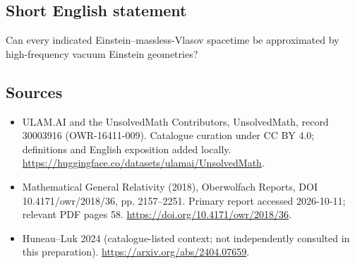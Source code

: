 \documentclass[11pt]{article}
\begin{document}
\subsection{Short English statement}
Can every indicated Einstein--massless-Vlasov spacetime be approximated by high-frequency vacuum Einstein geometries?
\subsection{Sources}
\begin{itemize}
\item[\hypertarget{source:30003916:1}{S1}] ULAM.AI and the UnsolvedMath Contributors, UnsolvedMath, record 30003916 (OWR-16411-009). Catalogue curation under CC BY 4.0; definitions and English exposition added locally.
\url{https://huggingface.co/datasets/ulamai/UnsolvedMath}.
\item[\hypertarget{source:30003916:2}{S2}] Mathematical General Relativity (2018), Oberwolfach Reports, DOI 10.4171/owr/2018/36, pp. 2157--2251. Primary report accessed 2026-10-11; relevant PDF pages 58.
\url{https://doi.org/10.4171/owr/2018/36}.
\item[\hypertarget{source:30003916:3}{S3}] Huneau--Luk 2024 (catalogue-listed context; not independently consulted in this preparation).
\url{https://arxiv.org/abs/2404.07659}.
\end{itemize}
\label{end:30003916}
\end{document}
